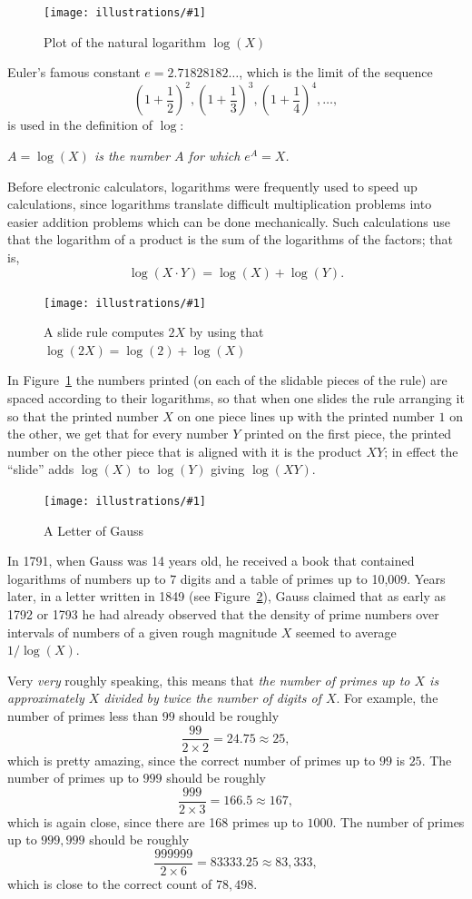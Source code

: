 \documentclass[openany]{book}
\newcommand{\ill}[3]{%
   \begin{figure}[H]%
   \vspace{-2ex}
   \centering%
   \texttt{[image: illustrations/\#1]}%
   \caption{#3}%
   \vspace{-2ex}
    \end{figure}}
\theoremstyle{plain}
\theoremstyle{definition}
\begin{document}
\ill{log}{.8}{Plot of the natural logarithm $\log(X)$}


 Euler's famous constant $e=2.71828182\ldots$, which is the limit
 of the sequence
 $$\left(1+{\frac{1}{2}}\right)^2,
       \left(1+{\frac{1}{3}}\right)^3,
       \left(1+{\frac{1}{4}}\right)^4, \dots,$$
is used in the definition of $\log$:
\begin{center}
{\em $A = \log(X)$ is the number $A$ for which $e^A = X$.}
\end{center}
Before electronic calculators, logarithms were frequently used to
speed up calculations, since logarithms translate difficult multiplication
problems into easier addition problems which can be done mechanically.
Such calculations use that the logarithm of a product is the sum of the logarithms
of the factors; that is, $$\log(X\cdot Y) = \log(X) + \log(Y).$$

\ill{slide_rule}{.8}{A slide rule  computes $2X$ by using that $\log(2X)=\log(2)+\log(X)$\label{fig:slide_rule}}

In Figure~\ref{fig:slide_rule} the numbers printed (on each of the slidable pieces of the rule)
are spaced according to their logarithms, so that when one slides the
rule arranging it so that the printed  number $X$ on one piece lines up
with the printed number $1$ on the other, we get that for every number $Y$
printed on the first piece, the printed number on the other piece that
is  aligned with it is the product $XY$; in effect the ``slide'' adds
$\log(X)$ to $\log(Y)$ giving $\log(XY)$.

\ill{gauss_tables_half}{.9}{A Letter of Gauss\label{fig:gauss_letter}}

In 1791, when Gauss was 14 years old, he received a book that contained
logarithms of numbers up to $7$ digits and a table of primes up to 10,009.
Years later, in a letter
written in 1849 (see Figure~\ref{fig:gauss_letter}), Gauss
claimed that as early as 1792 or 1793 he had already observed that the
density of prime numbers over intervals of numbers of a given rough
magnitude $X$ seemed to average $1/\log(X)$.

 Very {\em very} roughly speaking, this
means that {\em the number of primes up to $X$ is approximately $X$ divided by
twice the number of digits of $X$}.  For example,
the number of primes less than $99$ should be roughly
$$
   \frac{99}{2\times 2} = 24.75 \approx  25,
$$
which is pretty amazing, since the correct number of
primes up to $99$ is $25$.  The number of primes up to $999$ should
be roughly
$$
   \frac{999}{2\times 3} = 166.5 \approx  167,
$$
which is again close, since there are 168 primes up to $1000$.
The number of primes up to $999{,}999$ should be roughly
$$
   \frac{999999}{2\times 6} = 83333.25 \approx  83{,}333,
$$
which is close to the correct count of $78{,}498$.
\end{document}
